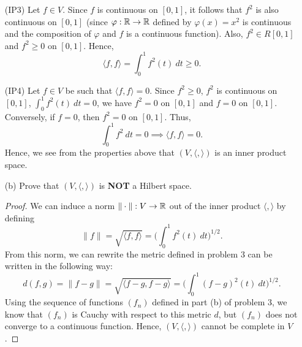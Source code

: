 \documentclass[a4paper]{article}
\begin{document}
\begin{enumerate}
    \item[(IP3)] Let \( f \in V  \). Since \( f  \) is continuous on \( [0,1] \), it follows that \( f^{2}  \) is also continuous on \( [0,1] \) (since \( \varphi: \mathbb{R} \to \mathbb{R}  \) defined by \( \varphi(x) = x^{2} \) is continuous and the composition of \( \varphi \) and \( f  \) is a continuous function). Also, \( f^{2} \in R[0,1] \) and \( f^{2} \geq 0  \) on \( [0,1] \). Hence, 
        \[  \langle f , f \rangle = \int_{ 0 }^{ 1 }  f^{2}(t)  \ dt \geq 0.   \]
    \item[(IP4)] Let \( f \in V  \) be such that \( \langle f , f \rangle = 0  \). Since \( f^{2} \geq 0  \), \( f^{2}  \) is continuous on \( [0,1] \), \( \int_{ 0 }^{ 1 }  f^{2}(t) \ dt = 0  \), we have \( f^{2} = 0  \) on \( [0,1] \) and \( f = 0  \) on \( [0,1] \). Conversely, if \( f = 0  \), then \( f^{2} =  0 \) on \( [0,1] \). Thus, 
        \[  \int_{ 0 }^{ 1 }  f^{2}  \ dt = 0 \implies \langle f , f \rangle = 0.  \]
        Hence, we see from the properties above that \( (V, \langle  ,  \rangle) \) is an inner product space.
    \item[(b)] Prove that \( (V, \langle  ,  \rangle) \) is \textbf{NOT} a Hilbert space. 
        \begin{proof}
        We can induce a norm \( \|\cdot\|: V \to \mathbb{R}  \) out of the inner product \( \langle  ,  \rangle \) by defining
    \[ \|f\| =   \sqrt{  \langle f   ,  f  \rangle }   = \Big( \int_{ 0 }^{ 1 }  f^{2}(t) \ dt \Big)^{1/2}. \]
    From this norm, we can rewrite the metric defined in problem 3 can be written in the following way:  
    \[  d(f,g) = \|f - g\| = \sqrt{ \langle f-g  , f-g  \rangle } = \Big(  \int_{ 0 }^{ 1 } (f -g)^{2}(t) \ dt \Big)^{1/2}.  \]
        Using the sequence of functions \( ({f}_{n}) \) defined in part (b) of problem 3, we know that \( ({f}_{n}) \) is Cauchy with respect to this metric \( d \), but \( ({f}_{n}) \) does not converge to a continuous function. Hence, \( (V, \langle  ,  \rangle) \) cannot be complete in \( V  \).
        \end{proof}
\end{enumerate}
    
\end{document}
